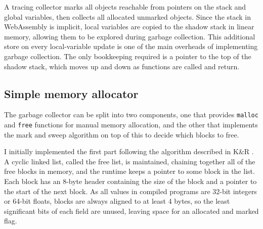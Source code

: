 
A tracing collector marks all objects reachable from pointers on the stack and global variables, then collects all allocated unmarked objects.
Since the stack in WebAssembly is implicit, local variables are copied to the shadow stack in linear memory, allowing them to be explored during garbage collection. This additional store on every local-variable update is one of the main overheads of implementing garbage collection. The only bookkeeping required is a pointer to the top of the shadow stack, which moves up and down as functions are called and return.



\subsection{Simple memory allocator}
The garbage collector can be split into two components, one that provides \verb|malloc| and \verb|free| functions for manual memory allocation, and the other that implements the mark and sweep algorithm on top of this to decide which blocks to free. 

I initially implemented the first part following the algorithm described in K\&R \cite{k_and_r}. A cyclic linked list, called the free list, is maintained, chaining together all of the free blocks in memory, and the runtime keeps a pointer to some block in the list. Each block has an 8-byte header containing the size of the block and a pointer to the start of the next block. %
As all values in compiled programs are 32-bit integers or 64-bit floats, blocks are always aligned to at least 4 bytes, so the least significant bits of each field are unused, leaving space for an allocated and marked flag. 

